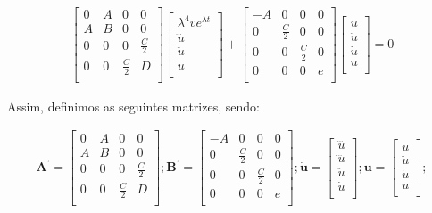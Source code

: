 \documentclass[a4paper,12p]{article}
\begin{document}
	\begin{equation}
	\begin{gathered}
	\begin{bmatrix}
	0&A&0&0 \\
	A&B&0&0 \\
	0&0&0&\frac{C}{2} \\
	0&0&\frac{C}{2}&D \\
	\end{bmatrix}
	\begin{bmatrix}
	\lambda^{4} ve^{\lambda t}\\
	\dddot{u}\\
	\ddot{u}\\
	\dot{u}\\
	\end{bmatrix}
	+
	\begin{bmatrix}
	-A&0&0&0 \\
	0&\frac{C}{2}&0&0 \\
	0&0&\frac{C}{2}&0 \\
	0&0&0&e \\
	\end{bmatrix}
	\begin{bmatrix}
	\dddot{u}\\
	\ddot{u}\\
	\dot{u}\\
	u\\
	\end{bmatrix}
	=
	0
	\end{gathered}
	\end{equation}
	
	
	Assim, definimos as seguintes matrizes, sendo:
	
		\begin{equation}
	\begin{gathered}
	\textbf{A}^{\textbf{'}} =
	\begin{bmatrix}
	0&A&0&0 \\
	A&B&0&0 \\
	0&0&0&\frac{C}{2} \\
	0&0&\frac{C}{2}&D \\
	\end{bmatrix};
	\textbf{B}^{\textbf{'}}=
	\begin{bmatrix}
	-A&0&0&0 \\
	0&\frac{C}{2}&0&0 \\
	0&0&\frac{C}{2}&0 \\
	0&0&0&e \\
	\end{bmatrix};
	\dot{\textbf{u}} =
	\begin{bmatrix}
	\ddddot{u}\\
	\dddot{u}\\
	\ddot{u}\\
	\dot{u}\\
	\end{bmatrix};
	\textbf{u} =
	\begin{bmatrix}
	\dddot{u}\\
	\ddot{u}\\
	\dot{u}\\
	u\\
	\end{bmatrix};
	\end{gathered}
	\end{equation}
	
\end{document}
